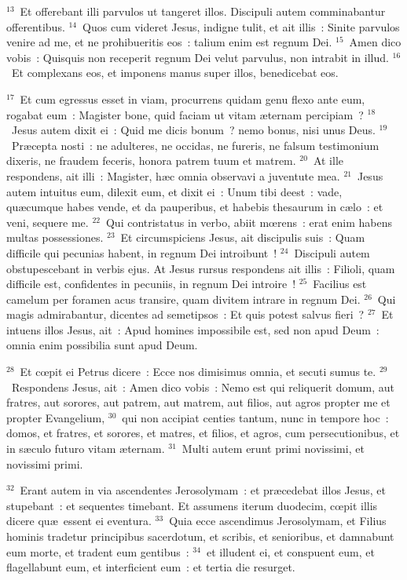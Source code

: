 ${}^{13}$~Et offerebant illi parvulos ut tangeret illos. Discipuli autem comminabantur offerentibus.
${}^{14}$~Quos cum videret Jesus, indigne tulit, et ait illis~: Sinite parvulos venire ad me, et ne prohibueritis eos~: talium enim est regnum Dei.
${}^{15}$~Amen dico vobis~: Quisquis non receperit regnum Dei velut parvulus, non intrabit in illud.
${}^{16}$~Et complexans eos, et imponens manus super illos, benedicebat eos.


${}^{17}$~Et cum egressus esset in viam, procurrens quidam genu flexo ante eum, rogabat eum~: Magister bone, quid faciam ut vitam \ae ternam percipiam~?
${}^{18}$~Jesus autem dixit ei~: Quid me dicis bonum~? nemo bonus, nisi unus Deus.
${}^{19}$~Pr\ae cepta nosti~: ne adulteres, ne occidas, ne fureris, ne falsum testimonium dixeris, ne fraudem feceris, honora patrem tuum et matrem.
${}^{20}$~At ille respondens, ait illi~: Magister, h\ae c omnia observavi a juventute mea.
${}^{21}$~Jesus autem intuitus eum, dilexit eum, et dixit ei~: Unum tibi deest~: vade, qu\ae cumque habes vende, et da pauperibus, et habebis thesaurum in c\ae lo~: et veni, sequere me.
${}^{22}$~Qui contristatus in verbo, abiit mœrens~: erat enim habens multas possessiones.
${}^{23}$~Et circumspiciens Jesus, ait discipulis suis~: Quam difficile qui pecunias habent, in regnum Dei introibunt~!
${}^{24}$~Discipuli autem obstupescebant in verbis ejus. At Jesus rursus respondens ait illis~: Filioli, quam difficile est, confidentes in pecuniis, in regnum Dei introire~!
${}^{25}$~Facilius est camelum per foramen acus transire, quam divitem intrare in regnum Dei.
${}^{26}$~Qui magis admirabantur, dicentes ad semetipsos~: Et quis potest salvus fieri~?
${}^{27}$~Et intuens illos Jesus, ait~: Apud homines impossibile est, sed non apud Deum~: omnia enim possibilia sunt apud Deum.


${}^{28}$~Et cœpit ei Petrus dicere~: Ecce nos dimisimus omnia, et secuti sumus te.
${}^{29}$~Respondens Jesus, ait~: Amen dico vobis~: Nemo est qui reliquerit domum, aut fratres, aut sorores, aut patrem, aut matrem, aut filios, aut agros propter me et propter Evangelium,
${}^{30}$~qui non accipiat centies tantum, nunc in tempore hoc~: domos, et fratres, et sorores, et matres, et filios, et agros, cum persecutionibus, et in s\ae culo futuro vitam \ae ternam.
${}^{31}$~Multi autem erunt primi novissimi, et novissimi primi.


${}^{32}$~Erant autem in via ascendentes Jerosolymam~: et pr\ae cedebat illos Jesus, et stupebant~: et sequentes timebant. Et assumens iterum duodecim, cœpit illis dicere qu\ae\ essent ei eventura.
${}^{33}$~Quia ecce ascendimus Jerosolymam, et Filius hominis tradetur principibus sacerdotum, et scribis, et senioribus, et damnabunt eum morte, et tradent eum gentibus~:
${}^{34}$~et illudent ei, et conspuent eum, et flagellabunt eum, et interficient eum~: et tertia die resurget.


